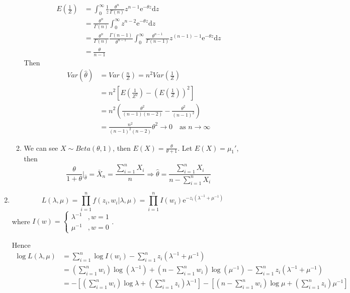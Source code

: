 \documentclass{article}
\begin{document}
\begin{enumerate}[leftmargin = 0 em, label = \arabic*., font = \bfseries]
\begin{enumerate}
		\begin{align*}
		E(\frac{1}{Z}) & = \int_{0}^\infty \frac{1}{z} \frac{\theta^n}{\Gamma(n)} z^{n-1} \mathrm{e}^{-\theta z}\mathrm{d}z\\
		& = \frac{\theta^n}{\Gamma(n)} \int_{0}^\infty z^{n-2} \mathrm{e}^{-\theta z} \mathrm{d}z\\
		& = \frac{\theta^n}{\Gamma(n)}\frac{\Gamma(n-1)}{\theta^{n-1}} \int_{0}^\infty \frac{\theta^{n-1}}{\Gamma(n-1)} z^{(n-1)-1} \mathrm{e}^{- \theta z} \mathrm{d}z\\
		& = \frac{\theta}{n-1}
		\end{align*}
		Then
		\begin{align*}
		Var(\hat{\theta}) & = Var(\frac{n}{Z})  = n^2 Var(\frac{1}{Z}) \\
		& = n^2 \left[E(\frac{1}{Z^2}) - (E(\frac{1}{Z}))^2\right]\\
		& = n^2 \left( \frac{\theta^2}{(n-1)(n-2)} - \frac{\theta^2}{(n-1)^2}\right)\\
		& = \frac{n^2}{(n-1)^2 (n-2)} \theta^2 \to 0 \quad \textrm{as $n \to \infty$}
		\end{align*}


		\item 
		We can see $X \sim Beta(\theta , 1)$, then $E(X) = \frac{\theta}{\theta + 1}$. Let $E(X) = \mu_1'$, then
		\[\frac{\theta}{1 + \theta} \bigg|_{\hat{\theta}}= \bar{X}_n = \frac{\sum_{i=1}^n X_i}{n} \Rightarrow \hat{\theta} = \frac{\sum_{i=1}^n X_i}{n - \sum_{i=1}^n X_i}\]
		
		
		
		
	\end{enumerate}

	\item 
	\[L(\lambda, \mu) = \prod_{i=1}^{n} f(z_i, w_i | \lambda, \mu) = \prod_{i=1}^n I(w_i) \mathrm{e}^{-z_i (\lambda^{-1} + \mu^{-1})}\]
	where $I(w) = \begin{cases}
		\lambda^{-1} &, w = 1\\
		\mu^{-1} & , w = 0
	\end{cases}$.

	Hence 
	\begin{align*}
	\log L(\lambda , \mu) &= \sum_{i=1}^n \log I(w_i) - \sum_{i=1}^n z_i (\lambda^{-1} + \mu^{-1})\\
	&= (\sum_{i=1}^n w_i) \log(\lambda^{-1}) + (n - \sum_{i=1}^n w_i) \log(\mu^{-1}) - \sum_{i=1}^n z_i (\lambda^{-1} + \mu^{-1})\\
	& = - [(\sum_{i=1}^n w_i) \log \lambda + (\sum_{i=1}^n z_i) \lambda^{-1} ] - [(n - \sum_{i=1}^n w_i) \log \mu + (\sum_{i=1}^n z_i) \mu^{-1}]
	\end{align*}


\end{enumerate}
\end{document}
